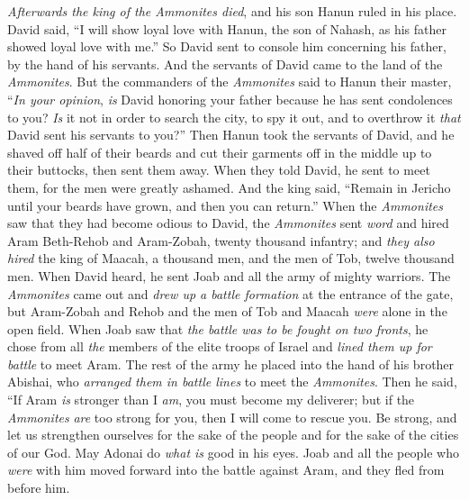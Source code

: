 \begin{biblechapter} %
 \textit{Afterwards the king of the Ammonites died}, and his son Hanun ruled in his place.
\verse David said, “I will show loyal love with Hanun, the son of Nahash, as his father showed loyal love with me.” So David sent to console him concerning his father, by the hand of his servants. And the servants of David came to the land of the \textit{Ammonites}.
\verse But the commanders of the \textit{Ammonites} said to Hanun their master, “\textit{In your opinion}, \textit{is} David honoring your father because he has sent condolences to you? \textit{Is} it not in order to search the city, to spy it out, and to overthrow it \textit{that} David sent his servants to you?”
\verse Then Hanun took the servants of David, and he shaved off half of their beards and cut their garments off in the middle up to their buttocks, then sent them away.
\verse When they told David, he sent to meet them, for the men were greatly ashamed. And the king said, “Remain in Jericho until your beards have grown, and then you can return.”
 When the \textit{Ammonites} saw that they had become odious to David, the \textit{Ammonites} sent \textit{word} and hired Aram Beth-Rehob and Aram-Zobah, twenty thousand infantry; and \textit{they also hired} the king of Maacah, a thousand men, and the men of Tob, twelve thousand men.
\verse When David heard, he sent Joab and all the army of mighty warriors.
\verse The \textit{Ammonites} came out and \textit{drew up a battle formation} at the entrance of the gate, but Aram-Zobah and Rehob and the men of Tob and Maacah \textit{were} alone in the open field.
\verse When Joab saw that \textit{the battle was to be fought on two fronts}, he chose from all \textit{the} members of the elite troops of Israel and \textit{lined them up for battle} to meet Aram.
\verse The rest of the army he placed into the hand of his brother Abishai, who \textit{arranged them in battle lines} to meet the \textit{Ammonites}.
\verse Then he said, “If Aram \textit{is} stronger than I \textit{am}, you must become my deliverer; but if the \textit{Ammonites} \textit{are} too strong for you, then I will come to rescue you.
\verse Be strong, and let us strengthen ourselves for the sake of the people and for the sake of the cities of our God. May Adonai do \textit{what is} good in his eyes.
\verse Joab and all the people who \textit{were} with him moved forward into the battle against Aram, and they fled from before him.

\end{biblechapter}
